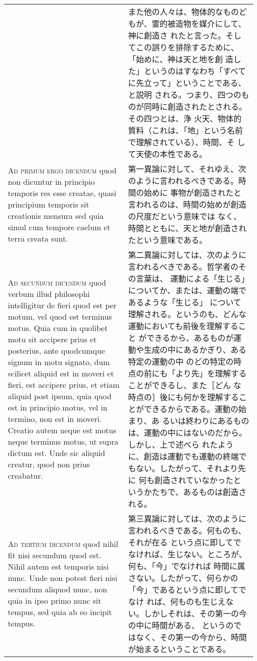 \documentclass[10pt]{jsarticle} %
\begin{document}
\begin{longtable}{p{21em}p{21em}}
&

また他の人々は、物体的なものどもが、霊的被造物を媒介にして、神に創造さ
れたと言った。そしてこの誤りを排除するために、「始めに、神は天と地を創
造した」というのはすなわち「すべてに先立って」ということである、と説明
される。つまり、四つのものが同時に創造されたとされる。その四つとは、浄
火天、物体的質料（これは、「地」という名前で理解されている）、時間、そ
して天使の本性である。

\\


{\scshape Ad primum ergo dicendum} quod non dicuntur in
principio temporis res esse creatae, quasi principium temporis sit
creationis mensura sed quia simul cum tempore caelum et terra creata
sunt.


&

第一異論に対して、それゆえ、次のように言われるべきである。時間の始めに
事物が創造されたと言われるのは、時間の始めが創造の尺度だという意味では
なく、時間とともに、天と地が創造されたという意味である。

\\


{\scshape Ad secundum dicendum} quod verbum illud
philosophi intelligitur de fieri quod est per motum, vel quod est
terminus motus. Quia cum in quolibet motu sit accipere prius et
posterius, ante quodcumque signum in motu signato, dum scilicet aliquid
est in moveri et fieri, est accipere prius, et etiam aliquid post ipsum,
quia quod est in principio motus, vel in termino, non est in
moveri. Creatio autem neque est motus neque terminus motus, ut supra
dictum est. Unde sic aliquid creatur, quod non prius creabatur.


&

第二異論に対しては、次のように言われるべきである。哲学者のその言葉は、
運動による「生じる」についてか、または、運動の端であるような「生じる」
について理解される。というのも、どんな運動においても前後を理解すること
ができるから、あるものが運動や生成の中にあるかぎり、ある特定の運動の中
のどの特定の時点の前にも「より先」を理解することができるし、また［どん
な時点の］後にも何かを理解することができるからである。運動の始まり、あ
るいは終わりにあるものは、運動の中にはないのだから。しかし、上で述べら
れたように、創造は運動でも運動の終端でもない。したがって、それより先に
何も創造されていなかったというかたちで、あるものは創造される。

\\


{\scshape Ad tertium dicendum} quod nihil fit nisi
secundum quod est. Nihil autem est temporis nisi nunc. Unde non potest
fieri nisi secundum aliquod nunc, non quia in ipso primo nunc sit
tempus, sed quia ab eo incipit tempus.

&

第三異論に対しては、次のように言われるべきである。何ものも、それが在る
という点に即してでなければ、生じない。ところが、何も、「今」でなければ
時間に属さない。したがって、何らかの「今」であるという点に即してでなけ
れば、何ものも生じえない。しかしそれは、その第一の今の中に時間がある、
というのではなく、その第一の今から、時間が始まるということである。

\end{longtable}
\end{document}
